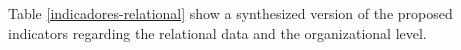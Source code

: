 \documentclass[a4paper, 12pt, openright, oneside, german, french, brazil, english]{abntex2}
\begin{document}

        Table \ref{indicadores-relational} show a synthesized version of the proposed indicators regarding the relational data and the organizational level.
	
	
	
	\begin{table}
		{\begin{tabular}{|c|c|}
				

\end{tabular}}
\end{table}
\end{document}
